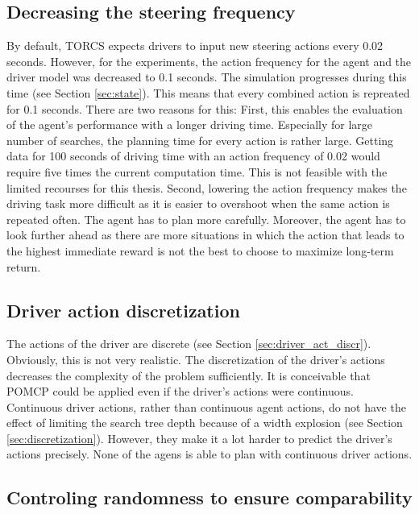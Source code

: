 \subsection{Decreasing the steering frequency}

By default, TORCS expects drivers to input new steering actions every 0.02 seconds. However, for the experiments, the action frequency for the agent and the driver model was decreased to 0.1 seconds. The simulation progresses during this time (see Section \ref{sec:state}). This means that every combined action is repreated for 0.1 seconds. There are two reasons for this: First, this enables the evaluation of the agent's performance with a longer driving time. Especially for large number of searches, the planning time for every action is rather large. Getting data for 100 seconds of driving time with an action frequency of 0.02 would require five times the current computation time. This is not feasible with the limited recourses for this thesis. Second, lowering the action frequency makes the driving task more difficult as it is easier to overshoot when the same action is repeated often. The agent has to plan more carefully.  Moreover, the agent has to look further ahead as there are more situations in which the action that leads to the highest immediate reward is not the best to choose to maximize long-term return.

\subsection{Driver action discretization}

The actions of the driver are discrete (see Section \ref{sec:driver_act_discr}). Obviously, this is not very realistic. The discretization of the driver's actions decreases the complexity of the problem sufficiently. It is conceivable that POMCP could be applied even if the driver's actions were continuous. Continuous driver actions, rather than continuous agent actions, do not have the effect of limiting the search tree depth because of a width explosion (see Section \ref{sec:discretization}). However, they make it a lot harder to predict the driver's actions precisely. None of the agens is able to plan with continuous driver actions. 

\subsection{Controling randomness to ensure comparability}

